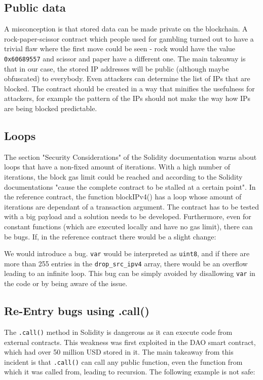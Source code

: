 

\subsection{Public data}
A misconception is that stored data can be made private on the blockchain. A rock-paper-scissor contract which people used for gambling turned out to have a trivial flaw where the first move could be seen - rock would have the value \texttt{0x60689557} and scissor and paper have a different one.
The main takeaway is that in our case, the stored IP addresses will be public (although maybe obfuscated) to everybody. Even attackers can determine the list of IPs that are blocked. The contract should be created in a way that minifies the usefulness for attackers, for example the pattern of the IPs should not make the way how IPs are being blocked predictable.

\subsection{Loops}
The section "Security Considerations" of the Solidity documentation warns about loops that have a non-fixed amount of iterations. With a high number of iterations, the block gas limit could be reached and according to the Solidity documentations "cause the complete contract to be stalled at a certain point". In the reference contract, the function blockIPv4() has a loop whose amount of iterations are dependant of a transaction argument. The contract has to be tested with a big payload and a solution needs to be developed.
Furthermore, even for constant functions (which are executed locally and have no gas limit), there can be bugs. If, in the reference contract there would be a slight change:



We would introduce a bug. \texttt{var} would be interpreted as \texttt{uint8}, and if there are more than 255 entries in the \texttt{drop\_src\_ipv4} array, there would be an overflow leading to an infinite loop.
This bug can be simply avoided by disallowing \texttt{var} in the code or by being aware of the issue.


\subsection{Re-Entry bugs using .call()}

The \texttt{.call()} method in Solidity is dangerous as it can execute code from external contracts. This weakness was first exploited in the DAO smart contract, which had over 50 million USD stored in it. The main takeaway from this incident is that \texttt{.call()} can call any public function, even the function from which it was called from, leading to recursion.
The following example is not safe:

